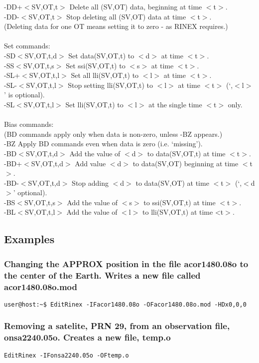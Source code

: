 \documentclass{article}
\begin{document}
\begin{\outputsize}
 -DD+$<$SV,OT,t$>$   Delete all (SV,OT) data, beginning at time $<$t$>$.\\
 -DD-$<$SV,OT,t$>$   Stop deleting all (SV,OT) data at time $<$t$>$.\\
     (Deleting data for one OT means setting it to zero - as RINEX requires.)\\
\\
 Set commands:\\
 -SD$<$SV,OT,t,d$>$  Set data(SV,OT,t) to $<$d$>$ at time $<$t$>$.\\
 -SS$<$SV,OT,t,s$>$  Set ssi(SV,OT,t) to $<$s$>$ at time $<$t$>$.\\
 -SL+$<$SV,OT,t,l$>$ Set all lli(SV,OT,t) to $<$l$>$ at time $<$t$>$.\\
 -SL-$<$SV,OT,t,l$>$ Stop setting lli(SV,OT,t) to $<$l$>$ at time $<$t$>$ (`,$<$l$>$' is optional).\\
 -SL$<$SV,OT,t,l$>$  Set lli(SV,OT,t) to $<$l$>$ at the single time $<$t$>$ only.\\
\\
 Bias commands:\\
  (BD commands apply only when data is non-zero, unless -BZ appears.)\\
 -BZ             Apply BD commands even when data is zero (i.e. `missing').\\
 -BD$<$SV,OT,t,d$>$  Add the value of $<$d$>$ to data(SV,OT,t) at time $<$t$>$.\\
 -BD+$<$SV,OT,t,d$>$ Add value $<$d$>$ to data(SV,OT) beginning at time $<$t$>$.\\
 -BD-$<$SV,OT,t,d$>$ Stop adding $<$d$>$ to data(SV,OT) at time $<$t$>$ (`,$<$d$>$' optional).\\
 -BS$<$SV,OT,t,s$>$  Add the value of $<$s$>$ to ssi(SV,OT,t) at time $<$t$>$.\\
 -BL$<$SV,OT,t,l$>$  Add the value of $<$l$>$ to lli(SV,OT,t) at time <t$>$.\\
\end{\outputsize}

\subsection{Examples}
\subsubsection{Changing the APPROX position in the file acor1480.08o to the center of the Earth. Writes a new file called acor1480.08o.mod}
\begin{verbatim}
user@host:~$ EditRinex -IFacor1480.08o -OFacor1480.08o.mod -HDx0,0,0 
\end{verbatim}

\subsubsection{Removing a satelite, PRN 29, from an observation file, onsa2240.05o. Creates a new file, temp.o}
\begin{verbatim}
EditRinex -IFonsa2240.05o -OFtemp.o 
\end{verbatim}
\end{document}

